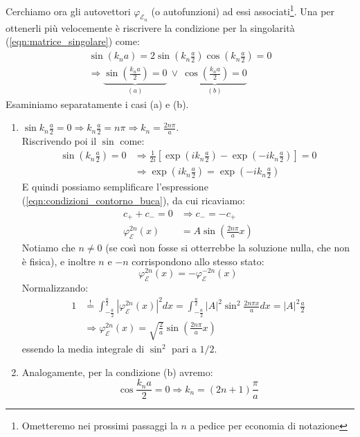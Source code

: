 \documentclass[../../FisicaTeorica.tex]{subfiles}
\begin{document}
Cerchiamo ora gli autovettori $\varphi_{\mathcal{E}_n}$ (o autofunzioni) ad essi associati\footnote{Ometteremo nei prossimi passaggi la $n$ a pedice per economia di notazione}. Una  per ottenerli più velocemente è riscrivere la condizione per la singolarità (\ref{eqn:matrice_singolare}) come:
\begin{align*}
\sin(k_n a) = 2\sin\left (k_n\frac{a}{2}\right )\cos\left (k_n \frac{a}{2}\right)=0 \\ \Rightarrow 
\underbrace{\sin\left(\frac{k_n a}{2}\right) = 0}_{(a)}\>\lor\>
\underbrace{\cos\left(\frac{k_n a}{2}\right) = 0}_{(b)}
\end{align*}
Esaminiamo separatamente i casi (a) e (b).
\begin{enumerate}[label=\alph*)]
\item $\displaystyle \sin k_n \frac{a}{2} = 0\Rightarrow k_n \frac{a}{2}=n\pi \Rightarrow k_n = \frac{2n\pi}{a}$.\\
Riscrivendo poi il $\sin$ come:
\begin{align*}
\sin\left(k_n\frac{a}{2}\right)=0&\Rightarrow \frac{1}{2i}\left[
\exp\left(ik_n\frac{a}{2}\right)-\exp\left(-ik_n\frac{a}{2}\right)
\right] = 0\\
&\Rightarrow \exp\left({ik_n\frac{a}{2}}\right)=\exp\left({-ik_n\frac{a}{2}}\right)
\end{align*}
E quindi possiamo semplificare l'espressione (\ref{eqn:condizioni_contorno_buca}), da cui ricaviamo:
\begin{align*}
c_+ + c_- = 0 &\Rightarrow c_- = -c_+\\
\varphi_\mathcal{E}^{2n}(x)&=A\sin \left(\frac{2n\pi}{a}x\right)
\end{align*}
Notiamo che $n\neq 0$ (se così non fosse si otterrebbe la soluzione nulla, che non è fisica), e inoltre $n$ e $-n$ corrispondono allo stesso stato:
\[
\varphi_\mathcal{E}^{2n}(x)=-\varphi_{\mathcal{E}}^{-2n}(x)
\]
Normalizzando:
\begin{align*}
1 &\overset{!}{=} \int_{-\frac{a}{2}}^{\frac{a}{2}} |\varphi_\mathcal{E}^{2n}(x)|^2 dx = \int_{-\frac{a}{2}}^{\frac{a}{2}} |A|^2 \sin^2 \frac{2n\pi x}{a}dx = |A|^2 \frac{a}{2} \\
&\Rightarrow \varphi_\mathcal{E}^{2n}(x)=\sqrt{\frac{2}{a}}\sin \left(\frac{2n\pi}{a}x\right)
\end{align*}
essendo la media integrale di $\sin^2$ pari a $1/2$.
\item Analogamente, per la condizione (b) avremo:
\[
\cos\frac{k_n a}{2}=0 \Rightarrow k_n = (2n+1)\frac{\pi}{a}
\]
\end{enumerate}
\end{document}
